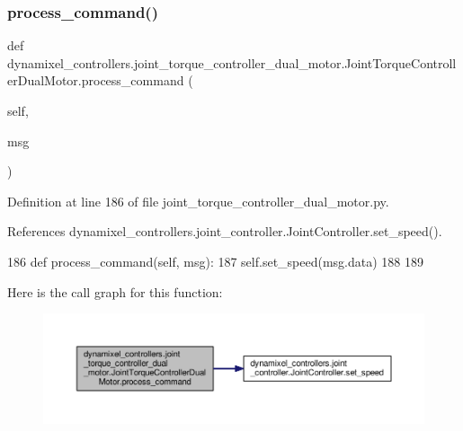\subsubsection{\texorpdfstring{process\+\_\+command()}{process\_command()}}
{\footnotesize\ttfamily def dynamixel\+\_\+controllers.\+joint\+\_\+torque\+\_\+controller\+\_\+dual\+\_\+motor.\+Joint\+Torque\+Controller\+Dual\+Motor.\+process\+\_\+command (\begin{DoxyParamCaption}\item[{}]{self,  }\item[{}]{msg }\end{DoxyParamCaption})}



Definition at line 186 of file joint\+\_\+torque\+\_\+controller\+\_\+dual\+\_\+motor.\+py.



References dynamixel\+\_\+controllers.\+joint\+\_\+controller.\+Joint\+Controller.\+set\+\_\+speed().


\begin{DoxyCode}
186     \textcolor{keyword}{def }process\_command(self, msg):
187         self.set\_speed(msg.data)
188 
189 \end{DoxyCode}
Here is the call graph for this function\+:
\nopagebreak
\begin{figure}[H]
\begin{center}
\leavevmode
\includegraphics[width=350pt]{d1/d31/classdynamixel__controllers_1_1joint__torque__controller__dual__motor_1_1_joint_torque_controller_dual_motor_ae64e20c0e569930cdda1fc75460ae422_cgraph}
\end{center}
\end{figure}
\mbox{\label{classdynamixel__controllers_1_1joint__torque__controller__dual__motor_1_1_joint_torque_controller_dual_motor_a97f500e3caad45a3050e41b31642cc5d}} 
